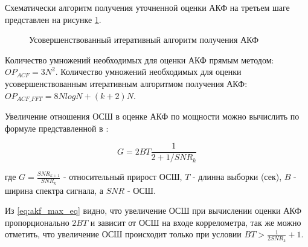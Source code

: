 Схематически алгоритм получения уточненной оценки АКФ на третьем шаге представлен на рисунке \ref{pic:akf_pic}.
\begin{figure}[H]
	\center{}
	\caption{Усовершенствованный итеративный алгоритм получения АКФ}
	\label{pic:akf_pic}
\end{figure}

Количество умножений необходимых для оценки АКФ прямым методом: ${OP_{ACF} = 3N^2}$. Количество умножений необходимых для оценки
усовершенствованным итеративным алгоритмом получения АКФ: ${OP_{ACF\_FFT} = 8NlogN + (k+2)N}$.

Увеличение отношения ОСШ в оценке АКФ по мощности можно вычислить по формуле представленной в \cite{book_max}:
\begin{center}
\begin{equation}
	\label{eq:akf_max_eq}
	G=2BT \frac{1}{2+1/SNR_k}
\end{equation}
\end{center}
где ${G=\frac{SNR_{k+1}}{SNR_k}}$ - относительный прирост ОСШ, ${T}$ - длинна выборки (сек), ${B}$ -  ширина спектра сигнала, 
а ${SNR}$ - ОСШ.

Из \ref{eq:akf_max_eq} видно, что увеличение ОСШ при вычислении оценки АКФ пропорционально ${2BT}$ и зависит от
ОСШ на входе коррелометра, так же можно отметить, что увеличение ОСШ происходит только при условии ${BT > \frac{1}{2SNR_k} + 1}$.
